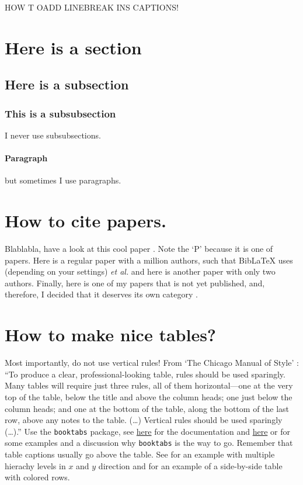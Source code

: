 HOW T OADD LINEBREAK INS CAPTIONS!



\blindtext
\section{Here is a section}
\blindtext
\subsection{Here is a subsection}
\blindtext
\subsubsection{This is a subsubsection}
I never use subsubsections.
\paragraph{Paragraph} but sometimes I use paragraphs.
\section{How to cite papers.}
Blablabla, have a look at this cool paper \cite{berke_transmon_2022}. Note the `P' because it is one of  papers. Here is a regular paper \cite{aruteQuantumSupremacyUsing2019a} with a million authors, such that BibLaTeX uses (depending on your settings) \textit{et al.} and here is another paper \cite{magesan_effective_2020} with only two authors. Finally, here is one of my papers that is not yet published, and, therefore, I decided that it deserves its own category \cite{inpreparation}.

\section{How to make nice tables?}
Most importantly, do not use vertical rules!
From `The Chicago Manual of Style' \cite{chicagoMOS}: ``To produce a clear, professional-looking table, rules should be used sparingly. Many tables will require just three rules, all of them horizontal—one at the very top of the table, below the title and above the column heads; one just below the column heads; and one at the bottom of the table, along the bottom of the last row, above any notes to the table. (\ldots) Vertical rules should be used sparingly (\ldots).'' 
Use the \verb|booktabs| package, see  \href{https://ctan.org/pkg/booktabs}{here} for the documentation and \href{https://nhigham.com/2019/11/19/better-latex-tables-with-booktabs/}{here} or \href{}{} for some examples and a discussion why \verb|booktabs| is the way to go. Remember that table captions usually go above the table. See  for an example with multiple hierachy levels in $x$ and $y$ direction and  for an example of a side-by-side table with colored rows.

